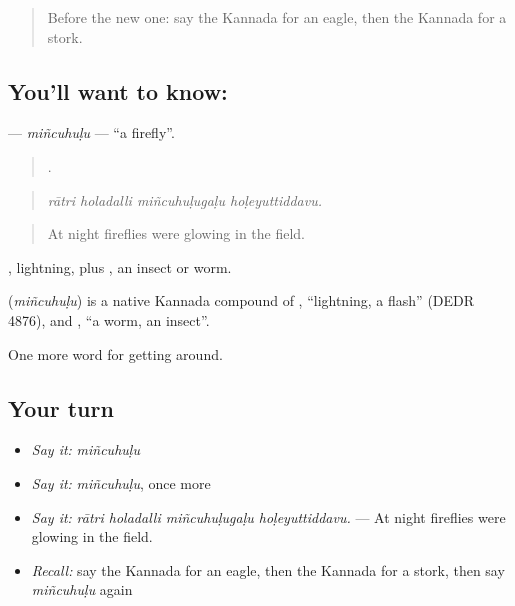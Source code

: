 \label{lesson:KA-C478-mincuhulu}



\begin{quote}
Before the new one: say the Kannada for an eagle, then the Kannada for a stork.
\end{quote}

\subsection*{You'll want to know: }
\textbf{} — \emph{miñcuhuḷu} — \textquotedblleft{}a firefly\textquotedblright{}.

\begin{quote}
   .
\end{quote}

\begin{quote}
\emph{rātri holadalli miñcuhuḷugaḷu hoḷeyuttiddavu.}
\end{quote}

\begin{quote}
At night fireflies were glowing in the field.
\end{quote}

, lightning, plus , an insect or worm.

\begin{cousinweb}
\textbf{} (\emph{miñcuhuḷu}) is a native Kannada compound of , \textquotedblleft{}lightning, a flash\textquotedblright{} (DEDR 4876), and , \textquotedblleft{}a worm, an insect\textquotedblright{}.
\end{cousinweb}

\begin{grammarlens}[title={What you've built}]
One more word for getting around.
\end{grammarlens}

\subsection*{Your turn}
\begin{itemize}
\raggedright
  \item \emph{Say it:} \emph{miñcuhuḷu}
  \item \emph{Say it:} \emph{miñcuhuḷu}, once more
  \item \emph{Say it:} \emph{rātri holadalli miñcuhuḷugaḷu hoḷeyuttiddavu.} — At night fireflies were glowing in the field.
  \item \emph{Recall:} say the Kannada for an eagle, then the Kannada for a stork, then say \emph{miñcuhuḷu} again
\end{itemize}

